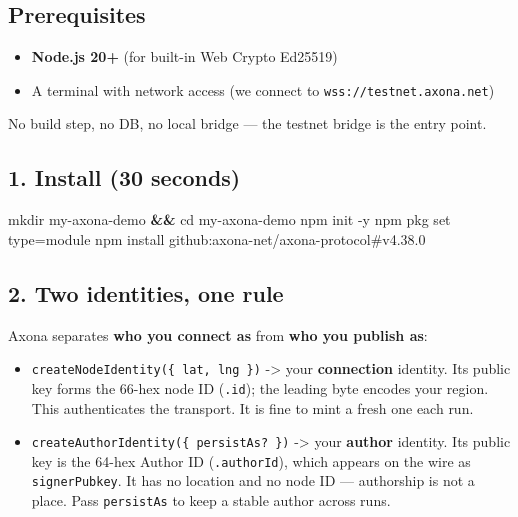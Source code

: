 \documentclass[
  nobib]{tufte-handout}
\newenvironment{Shaded}{}{}
\newcommand{\AttributeTok}[1]{\textcolor[rgb]{0.49,0.56,0.16}{#1}}
\newcommand{\BuiltInTok}[1]{\textcolor[rgb]{0.00,0.50,0.00}{#1}}
\newcommand{\ExtensionTok}[1]{#1}
\newcommand{\FunctionTok}[1]{\textcolor[rgb]{0.02,0.16,0.49}{#1}}
\newcommand{\KeywordTok}[1]{\textcolor[rgb]{0.00,0.44,0.13}{\textbf{#1}}}
\newcommand{\NormalTok}[1]{#1}
\providecommand{\tightlist}{%
  \setlength{\itemsep}{0pt}\setlength{\parskip}{0pt}}
\begin{document}
\subsection{Prerequisites}\label{prerequisites}

\begin{itemize}
\tightlist
\item
  \textbf{Node.js 20+} (for built-in Web Crypto Ed25519)
\item
  A terminal with network access (we connect to
  \texttt{wss://testnet.axona.net})
\end{itemize}

No build step, no DB, no local bridge --- the testnet bridge is the
entry point.

\subsection{1. Install (30 seconds)}\label{install-30-seconds}

\begin{Shaded}
\begin{Highlighting}[]
\FunctionTok{mkdir}\NormalTok{ my{-}axona{-}demo }\KeywordTok{\&\&} \BuiltInTok{cd}\NormalTok{ my{-}axona{-}demo}
\ExtensionTok{npm}\NormalTok{ init }\AttributeTok{{-}y}
\ExtensionTok{npm}\NormalTok{ pkg set type=module}
\ExtensionTok{npm}\NormalTok{ install github:axona{-}net/axona{-}protocol\#v4.38.0}
\end{Highlighting}
\end{Shaded}

\subsection{2. Two identities, one rule}\label{two-identities-one-rule}

Axona separates \textbf{who you connect as} from \textbf{who you publish
as}:

\begin{itemize}
\tightlist
\item
  \texttt{createNodeIdentity(\{\ lat,\ lng\ \})} -\textgreater{} your
  \textbf{connection} identity. Its public key forms the 66-hex node ID
  (\texttt{.id}); the leading byte encodes your region. This
  authenticates the transport. It is fine to mint a fresh one each run.
\item
  \texttt{createAuthorIdentity(\{\ persistAs?\ \})} -\textgreater{} your
  \textbf{author} identity. Its public key is the 64-hex Author ID
  (\texttt{.authorId}), which appears on the wire as
  \texttt{signerPubkey}. It has no location and no node ID ---
  authorship is not a place. Pass \texttt{persistAs} to keep a stable
  author across runs.
\end{itemize}
\end{document}
